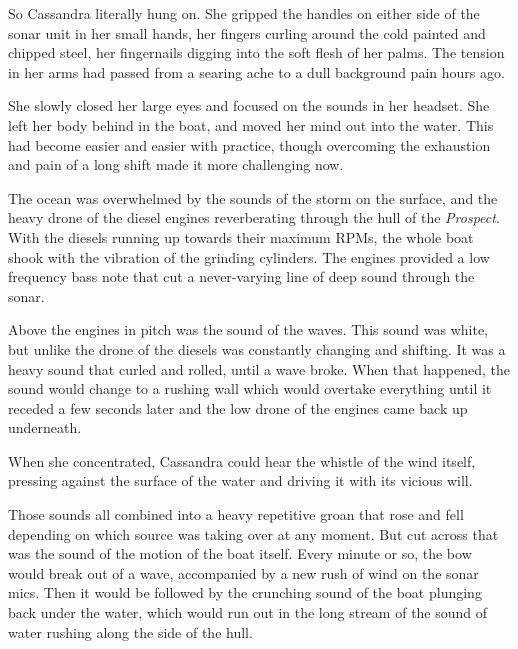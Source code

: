 \documentclass[
]{scrbook}
\begin{document}
So Cassandra literally hung on. She gripped the handles on either side
of the sonar unit in her small hands, her fingers curling around the
cold painted and chipped steel, her fingernails digging into the soft
flesh of her palms. The tension in her arms had passed from a searing
ache to a dull background pain hours ago.

She slowly closed her large eyes and focused on the sounds in her
headset. She left her body behind in the boat, and moved her mind out
into the water. This had become easier and easier with practice, though
overcoming the exhaustion and pain of a long shift made it more
challenging now.

The ocean was overwhelmed by the sounds of the storm on the surface, and
the heavy drone of the diesel engines reverberating through the hull of
the \emph{Prospect}. With the diesels running up towards their maximum
RPMs, the whole boat shook with the vibration of the grinding cylinders.
The engines provided a low frequency bass note that cut a never-varying
line of deep sound through the sonar.

Above the engines in pitch was the sound of the waves. This sound was
white, but unlike the drone of the diesels was constantly changing and
shifting. It was a heavy sound that curled and rolled, until a wave
broke. When that happened, the sound would change to a rushing wall
which would overtake everything until it receded a few seconds later and
the low drone of the engines came back up underneath.

When she concentrated, Cassandra could hear the whistle of the wind
itself, pressing against the surface of the water and driving it with
its vicious will.

Those sounds all combined into a heavy repetitive groan that rose and
fell depending on which source was taking over at any moment. But cut
across that was the sound of the motion of the boat itself. Every minute
or so, the bow would break out of a wave, accompanied by a new rush of
wind on the sonar mics. Then it would be followed by the crunching sound
of the boat plunging back under the water, which would run out in the
long stream of the sound of water rushing along the side of the hull.
\end{document}

